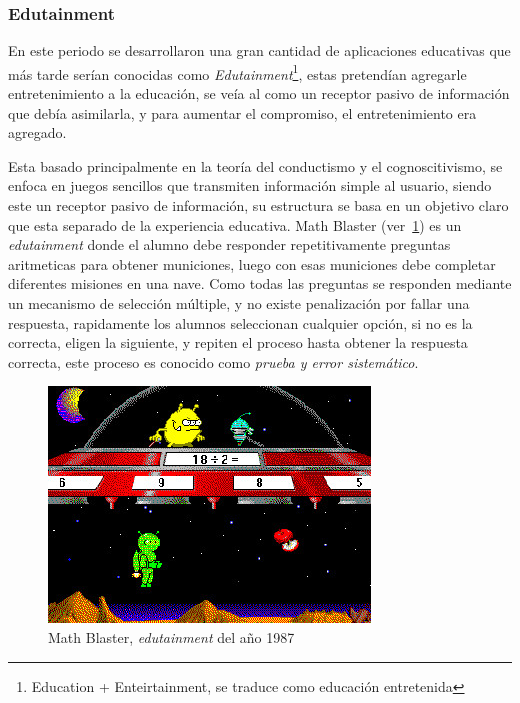 \subsubsection{Edutainment}

En este periodo se desarrollaron una gran cantidad de aplicaciones educativas
que más tarde serían conocidas como \emph{Edutainment}\footnote{Education +
	Enteirtainment, se traduce como educación entretenida}, estas pretendían
agregarle entretenimiento a la educación, se veía al como un receptor pasivo de
información que debía asimilarla, y para aumentar el compromiso, el
entretenimiento era agregado\cite{resnick:2004}.

Esta basado principalmente en la teoría del conductismo y el cognoscitivismo, se
enfoca en juegos sencillos que transmiten información simple al usuario, siendo
este un receptor pasivo de información, su estructura se basa en un objetivo
claro que esta separado de la experiencia educativa\cite{egenfeldt2007third}.
Math Blaster (ver~\ref{fig:math_blaster}) es un \emph{edutainment} donde el
alumno debe responder repetitivamente preguntas aritmeticas para obtener
municiones, luego con esas municiones debe completar diferentes misiones en una
nave\cite{bruckman1999can}. Como todas las preguntas se responden mediante un
mecanismo de selección múltiple, y no existe penalización por fallar una
respuesta, rapidamente los alumnos seleccionan cualquier opción, si no es la
correcta, eligen la siguiente, y repiten el proceso hasta obtener la respuesta
correcta, este proceso es conocido como \emph{prueba y error sistemático}. 

\begin{figure}[h!] 
	\centering 
	\includegraphics[scale=0.5,natwidth=296,natheight=217]{tics/math_blaster.jpg}
	\caption{Math Blaster, \emph{edutainment} del año 1987}
	\label{fig:math_blaster} 
\end{figure}

